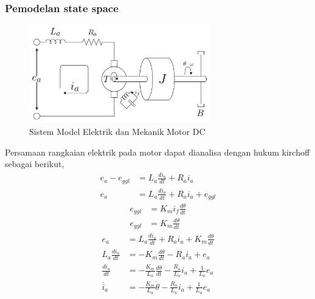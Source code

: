 \documentclass[../main.tex]{subfiles}
\begin{document}
            \subsubsection{Pemodelan state space}
                \begin{figure}[H]
                    \centering\includegraphics[width = 0.7\textwidth]{assets/image/pemodelan_motor.png}
                    \caption{Sistem Model Elektrik dan Mekanik Motor DC}
                    \label{gambar_1}
                \end{figure}
                Persamaan rangkaian elektrik pada motor dapat dianalisa dengan hukum kirchoff sebagai berikut,
                \begin{equation}
                    \begin{split}
                        e_a - e_{ggl} &= L_a\frac{di_a}{dt} + R_a i_a \\[5pt]
                        e_a &= L_a \frac{di_a}{dt} + R_a i_a + e_{ggl}
                    \end{split}
                \end{equation}
                \begin{equation}
                    \begin{split}
                        e_{ggl} &= K_m i_f \frac{d\theta}{dt} \\[5pt]
                        e_{ggl} &= K_m \frac{d\theta}{dt}
                    \end{split}
                \end{equation}
                \begin{equation}
                    \begin{split}
                        e_a &= L_a\frac{di_a}{dt} + R_a i_a + K_m\frac{d\theta}{dt} \\[5pt]
                        L_a\frac{di_a}{dt} &= -K_m\frac{d\theta}{dt} - R_a i_a + e_a \\[5pt]
                        \frac{di_a}{dt} &= -\frac{K_m}{L_a}\frac{d\theta}{dt} - \frac{R_a}{L_a}i_a + \frac{1}{L_a}e_a \\[5pt]
                        \dot{i_a} &= -\frac{K_m}{L_a}\dot{\theta} - \frac{R_a}{L_a}i_a + \frac{1}{L_a}e_a
                    \end{split}
                \end{equation}
                
\end{document}
